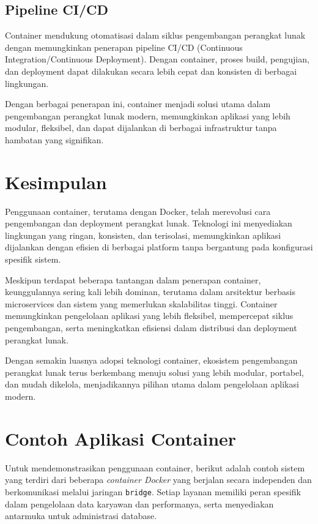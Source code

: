 \subsection{Pipeline CI/CD}
Container mendukung otomatisasi dalam siklus pengembangan perangkat lunak dengan memungkinkan penerapan pipeline CI/CD (Continuous Integration/Continuous Deployment). Dengan container, proses build, pengujian, dan deployment dapat dilakukan secara lebih cepat dan konsisten di berbagai lingkungan.

Dengan berbagai penerapan ini, container menjadi solusi utama dalam pengembangan perangkat lunak modern, memungkinkan aplikasi yang lebih modular, fleksibel, dan dapat dijalankan di berbagai infrastruktur tanpa hambatan yang signifikan.


\section{Kesimpulan}

Penggunaan container, terutama dengan Docker, telah merevolusi cara pengembangan dan deployment perangkat lunak. Teknologi ini menyediakan lingkungan yang ringan, konsisten, dan terisolasi, memungkinkan aplikasi dijalankan dengan efisien di berbagai platform tanpa bergantung pada konfigurasi spesifik sistem.

Meskipun terdapat beberapa tantangan dalam penerapan container, keunggulannya sering kali lebih dominan, terutama dalam arsitektur berbasis microservices dan sistem yang memerlukan skalabilitas tinggi. Container memungkinkan pengelolaan aplikasi yang lebih fleksibel, mempercepat siklus pengembangan, serta meningkatkan efisiensi dalam distribusi dan deployment perangkat lunak.

Dengan semakin luasnya adopsi teknologi container, ekosistem pengembangan perangkat lunak terus berkembang menuju solusi yang lebih modular, portabel, dan mudah dikelola, menjadikannya pilihan utama dalam pengelolaan aplikasi modern.



\section{Contoh Aplikasi Container}

Untuk mendemonstrasikan penggunaan container, berikut adalah contoh sistem yang terdiri dari beberapa \textit{container Docker} yang berjalan secara independen dan berkomunikasi melalui jaringan \texttt{bridge}. Setiap layanan memiliki peran spesifik dalam pengelolaan data karyawan dan performanya, serta menyediakan antarmuka untuk administrasi database.

